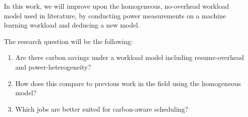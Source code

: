 In this work, we will improve upon the homogeneous, no-overhead workload model used in literature, by conducting power measurements on a machine learning workload and deducing a new model.

The research question will be the following:

\begin{enumerate}
    \item Are there carbon savings under a workload model including resume-overhead and power-heterogeneity?
    \item How does this compare to previous work in the field using the homogeneous model?
    \item Which jobs are better suited for carbon-aware scheduling?
\end{enumerate}

